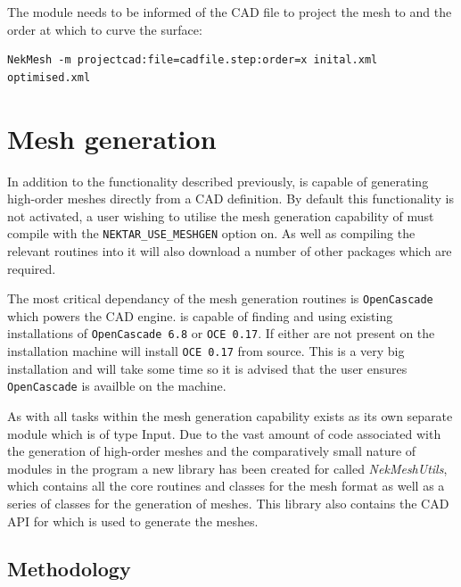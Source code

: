 The module needs to be informed of the CAD file to project the mesh to and the
order at which to curve the surface:
\begin{lstlisting}[style=BashInputStyle]
  NekMesh -m projectcad:file=cadfile.step:order=x inital.xml optimised.xml
\end{lstlisting}


\section{Mesh generation}

In addition to the functionality described previously, \nm is capable of
generating high-order meshes directly from a CAD definition. By default this
functionality is not activated, a user wishing to utilise the mesh generation
capability of \nm must compile \nekpp with the \texttt{NEKTAR\_USE\_MESHGEN}
option on. As well as compiling the relevant routines into \nm it will also
download a number of other packages which are required.

The most critical dependancy of the mesh generation routines is
\texttt{OpenCascade} which powers the CAD engine. \nm is capable of finding and
using existing installations of \texttt{OpenCascade 6.8} or \texttt{OCE 0.17}.
If either are not present on the installation machine \nm will install
\texttt{OCE 0.17} from source. This is a very big installation and will take
some time so it is advised that the user ensures \texttt{OpenCascade} is
availble on the machine.

As with all tasks within \nm the mesh generation capability exists as its
own separate module which is of type Input. Due to the vast amount of code
associated with the generation of high-order meshes and the comparatively small
nature of modules in the \nm program a new library has been created for \nekpp
called {\em NekMeshUtils}, which contains all the core routines and classes for
the \nm mesh format as well as a series of classes for the generation of meshes.
This library also contains the CAD API for \nekpp which is used to generate the
meshes.

\subsection{Methodology}


